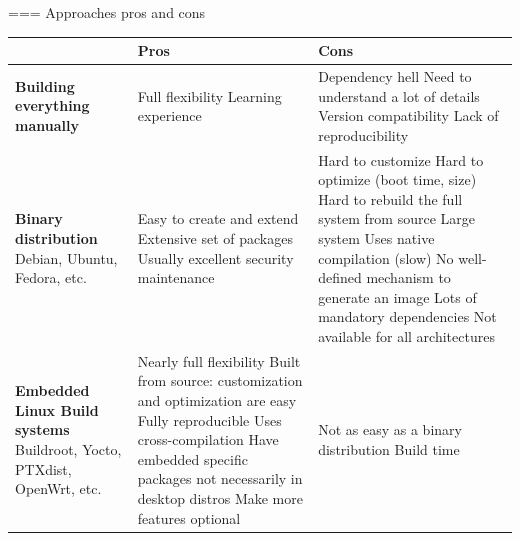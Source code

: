 === {Approaches pros and cons}
  \begin{center}
  \tiny
  \begin{tabularx}{13cm}{|X|X|X|}
    \hline
    & {\bf Pros} & {\bf Cons} \\
    \hline
    {\bf Building everything manually} &
    Full flexibility \newline
    Learning experience &
    Dependency hell \newline
    Need to understand a lot of details \newline
    Version compatibility \newline
    Lack of reproducibility \\
    \hline
    {\bf Binary distribution} \newline Debian, Ubuntu, Fedora, etc.
    &
    Easy to create and extend \newline
    Extensive set of packages \newline
    Usually excellent security maintenance
    &
    Hard to customize \newline
    Hard to optimize (boot time, size) \newline
    Hard to rebuild the full system from source \newline
    Large system \newline
    Uses native compilation (slow) \newline
    No well-defined mechanism to generate an image \newline
    Lots of mandatory dependencies \newline
    Not available for all architectures \\
    \hline
    {\bf Embedded Linux Build systems} \newline Buildroot, Yocto, PTXdist, OpenWrt, etc.
    &
    Nearly full flexibility \newline
    Built from source: customization and optimization are easy \newline
    Fully reproducible \newline
    Uses cross-compilation \newline
    Have embedded specific packages not necessarily in desktop distros \newline
    Make more features optional
    &
    Not as easy as a binary distribution \newline
    Build time \\
    \hline
  \end{tabularx}
  \end{center}


